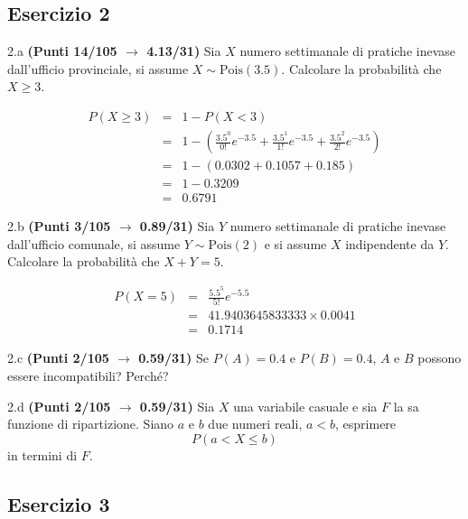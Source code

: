 \documentclass[
  11pt,
]{book}
\theoremstyle{mytheoremstyle}
\theoremstyle{mydefstyle}
\newenvironment{sol}
  {
  \begin{tcolorbox}[enhanced,breakable,arc=0.1mm,boxrule=1pt,colback=white,colframe=iblue,
  title=\bf \fontfamily{lmss}\selectfont \hspace{.5 cm} Soluzione,drop fuzzy shadow]

}{
\end{tcolorbox}
  }
\begin{document}
\subsection{Esercizio 2}\label{esercizio-2-36}

2.a \textbf{(Punti 14/105 \(\rightarrow\) 4.13/31)} Sia \(X\) numero settimanale di pratiche inevase dall'ufficio provinciale, si assume \(X\sim\text{Pois}(3.5)\). Calcolare la probabilità che \(X\geq 3\).

\begin{sol}
\begin{eqnarray*}
   P( X \geq 3 ) &=& 1-P( X < 3 ) \\                 &=& 1-\left( \frac{ 3.5 ^{ 0 }}{ 0 !}e^{- 3.5 }+\frac{ 3.5 ^{ 1 }}{ 1 !}e^{- 3.5 }+\frac{ 3.5 ^{ 2 }}{ 2 !}e^{- 3.5 } \right)\\                 &=& 1-( 0.0302+0.1057+0.185 )\\                 &=& 1- 0.3209 \\                 &=&   0.6791 
\end{eqnarray*}

\end{sol}

2.b \textbf{(Punti 3/105 \(\rightarrow\) 0.89/31)} Sia \(Y\) numero settimanale di pratiche inevase dall'ufficio comunale, si assume \(Y\sim\text{Pois}(2)\) e si assume \(X\) indipendente da \(Y\). Calcolare la probabilità che \(X+Y=5\).

\begin{sol}
\begin{eqnarray*}
   P( X = 5 )  &=& \frac{ 5.5 ^{ 5 }}{ 5 !}e^{- 5.5 }\\                 &=& 41.9403645833333 \times 0.0041 \\                 &=& 0.1714 
\end{eqnarray*}

\end{sol}

2.c \textbf{(Punti 2/105 \(\rightarrow\) 0.59/31)} Se \(P(A)=0.4\) e \(P(B)=0.4\), \(A\) e \(B\) possono essere incompatibili? Perché?

2.d \textbf{(Punti 2/105 \(\rightarrow\) 0.59/31)} Sia \(X\) una variabile casuale e sia \(F\) la sa funzione di ripartizione. Siano \(a\) e \(b\) due numeri reali, \(a<b\), esprimere
\[
P(a<X\leq b)
\]
in termini di \(F\).

\subsection{Esercizio 3}\label{esercizio-3-35}
\end{document}
